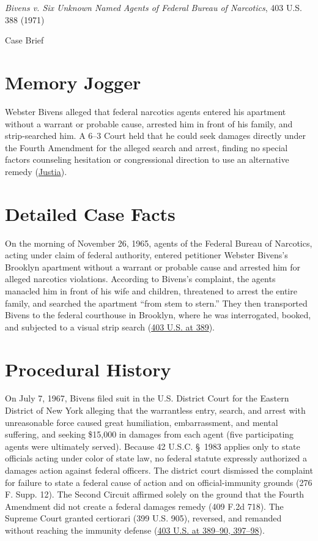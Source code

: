\documentclass[12pt]{article}
\begin{document}
\begin{center}
{\LARGE \textit{Bivens v. Six Unknown Named Agents of Federal Bureau of Narcotics}, 403 U.S. 388 (1971)\par}
\vspace{0.8em}
{\large Case Brief\par}
\end{center}
\vspace{1em}

\section{Memory Jogger}
Webster Bivens alleged that federal narcotics agents entered his apartment without a warrant or probable cause, arrested him in front of his family, and strip-searched him. A 6--3 Court held that he could seek damages directly under the Fourth Amendment for the alleged search and arrest, finding no special factors counseling hesitation or congressional direction to use an alternative remedy (\href{https://supreme.justia.com/cases/federal/us/403/388/}{Justia}).

\section{Detailed Case Facts}
On the morning of November 26, 1965, agents of the Federal Bureau of Narcotics, acting under claim of federal authority, entered petitioner Webster Bivens's Brooklyn apartment without a warrant or probable cause and arrested him for alleged narcotics violations. According to Bivens's complaint, the agents manacled him in front of his wife and children, threatened to arrest the entire family, and searched the apartment ``from stem to stern.'' They then transported Bivens to the federal courthouse in Brooklyn, where he was interrogated, booked, and subjected to a visual strip search (\href{https://supreme.justia.com/cases/federal/us/403/388/}{403 U.S. at 389}).

\section{Procedural History}
On July 7, 1967, Bivens filed suit in the U.S. District Court for the Eastern District of New York alleging that the warrantless entry, search, and arrest with unreasonable force caused great humiliation, embarrassment, and mental suffering, and seeking \$15,000 in damages from each agent (five participating agents were ultimately served). Because 42 U.S.C. \S~1983 applies only to state officials acting under color of state law, no federal statute expressly authorized a damages action against federal officers. The district court dismissed the complaint for failure to state a federal cause of action and on official-immunity grounds (276 F. Supp. 12). The Second Circuit affirmed solely on the ground that the Fourth Amendment did not create a federal damages remedy (409 F.2d 718). The Supreme Court granted certiorari (399 U.S. 905), reversed, and remanded without reaching the immunity defense (\href{https://www.law.cornell.edu/supremecourt/text/403/388}{403 U.S. at 389--90, 397--98}).
\end{document}
